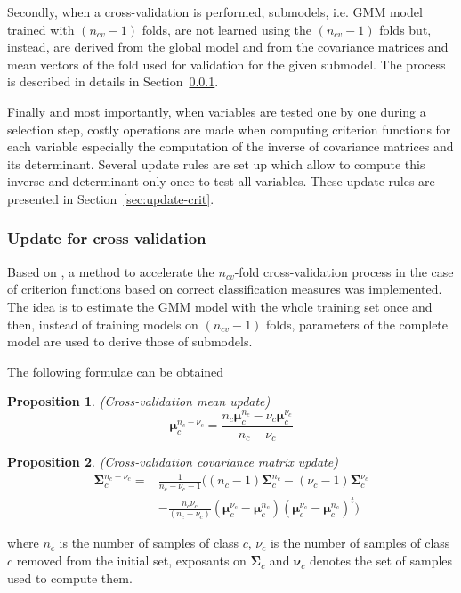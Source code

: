 \documentclass[journal,peerreview,onecolumn]{IEEEtran}
\newtheorem{prop}{Proposition}
\begin{document}
    Secondly, when a cross-validation is performed, submodels, i.e. GMM model trained with $(n_{cv}-1)$ folds, are not learned using the $(n_{cv}-1)$ folds but, instead, are derived from the global model and from the covariance matrices and mean vectors of the fold used for validation for the given submodel. The process is described in details in Section~\ref{sec:update-cv}.

    Finally and most importantly, when variables are tested one by one during a selection step, costly operations are made when computing criterion functions for each variable especially the computation of the inverse of covariance matrices and its determinant. Several update rules are set up which allow to compute this inverse and determinant only once to test all variables. These update rules are presented in Section~\ref{sec:update-crit}.

        \subsubsection{Update for cross validation}
        \label{sec:update-cv}

        Based on \cite{fauvel2015fast}, a method to accelerate the $n_{cv}$-fold cross-validation process in the case of criterion functions based on correct classification measures was implemented. The idea is to estimate the GMM model with the whole training set once and then, instead of training models on $(n_{cv}-1)$ folds, parameters of the complete model are used to derive those of submodels.

        The following formulae can be obtained
        \begin{prop}
            \label{eq:update-cv1}
            (Cross-validation mean update)
            \begin{equation*}
                \boldsymbol{\mu}_c^{n_c-\nu_c} = \frac{n_c \boldsymbol{\mu}_c^{n_c} - \nu_c \boldsymbol{\mu}_c^{\nu_c}}{n_c - \nu_c} \nonumber
            \end{equation*}
        \end{prop}
        \begin{prop}
            \label{eq:update-cv2}
            (Cross-validation covariance matrix update)
            \begin{align*}
                \boldsymbol{\Sigma}_c^{n_c-\nu_c} = &\frac{1}{n_c-\nu_c-1} \biggl( (n_c-1) \boldsymbol{\Sigma}_c^{n_c} - (\nu_c-1) \boldsymbol{\Sigma}_c^{\nu_c} \nonumber \\
                &- \frac{n_c \nu_c}{(n_c-\nu_c)} (\boldsymbol{\mu}_c^{\nu_c}-\boldsymbol{\mu}_c^{n_c})(\boldsymbol{\mu}_c^{\nu_c}-\boldsymbol{\mu}_c^{n_c})^t \biggr) \nonumber
            \end{align*}
        \end{prop}
        where $n_c$ is the number of samples of class $c$, $\nu_c$ is the number of samples of class $c$ removed from the initial set, exposants on $\boldsymbol{\Sigma}_c$ and $\boldsymbol{\nu}_c$ denotes the set of samples used to compute them.
\end{document}
